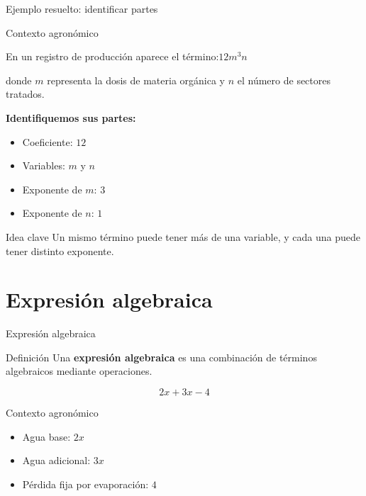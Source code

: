 \documentclass[aspectratio=169,12pt]{beamer}
\newcommand{\IdeaClave}[1]{
	\begin{alertblock}{Idea clave}
		#1
	\end{alertblock}
}
\newcommand{\Agronomia}[1]{
	\begin{exampleblock}{Contexto agronómico}
		#1
	\end{exampleblock}
}
\begin{document}
	\begin{frame}{Ejemplo resuelto: identificar partes}
		\Agronomia{
			En un registro de producción aparece el término:\quad $12m^3n$
			
			\smallskip 
			
			donde \(m\) representa la dosis de materia orgánica y \(n\) el número de sectores tratados.
		}
		
		\pause
		\textbf{Identifiquemos sus partes:}
		\begin{itemize}
			\item Coeficiente: \(12\)
			\pause
			\item Variables: \(m\) y \(n\)
			\pause
			\item Exponente de \(m\): \(3\)
			\pause
			\item Exponente de \(n\): \(1\)
		\end{itemize}
		
		\pause
		\IdeaClave{Un mismo término puede tener más de una variable, y cada una puede tener distinto exponente.}
	\end{frame}
	
	\section{Expresión algebraica}
	\begin{frame}{Expresión algebraica}
		\begin{block}{Definición}
			Una \textbf{expresión algebraica} es una combinación de términos algebraicos mediante operaciones.
		\end{block}
		
		\pause
		\[
		2x + 3x - 4
		\]
		
		\pause
		\Agronomia{
			\begin{itemize}
				\item Agua base: \(2x\)
				\pause
				\item Agua adicional: \(3x\)
				\pause
				\item Pérdida fija por evaporación: \(4\)
			\end{itemize}
		}
	\end{frame}
	
\end{document}
